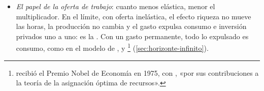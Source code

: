 \documentclass[11pt]{article}
\begin{document}
\begin{itemize}
\begin{itemize}
  \item a largo plazo, un gasto \emph{permanente} eleva el capital en la misma proporción que el empleo, y el multiplicador llega a 0,75~con esta calibración;\footnote{Con un gasto permanente, el tipo de interés y la ratio capital-trabajo vuelven a su nivel, así que el salario no cambia; de la condición del trabajo, $\varphi\,\hat L=-\theta\,\hat C$, y de la restricción de recursos sale $\Delta Y/\Delta G=1/[s_C(\theta+\varphi)/\theta+s_G]$, con $s_C$ y $s_G$ los pesos del consumo y del gasto en el PIB (locales). Con $\theta=\varphi=1$, $s_C\approx0{,}563$ y $s_G=0{,}2$, 0,75.} con una oferta de trabajo más elástica puede superar la unidad\nocite{BaxterKing1993Fiscal}.
  \end{itemize}
\item \emph{El papel de la oferta de trabajo}: cuanto menos elástica, menor el multiplicador. En el límite, con oferta inelástica, el efecto riqueza no mueve las horas, la producción no cambia y el gasto expulsa consumo e inversión privados uno a uno: es la . Con un gasto permanente, todo lo expulsado es consumo, como en el modelo de ,  y \footnote{ recibió el Premio Nobel de Economía en 1975, con , «por sus contribuciones a la teoría de la asignación óptima de recursos»\nocite{NobelPrize1975Koopmans}.} (\ref{sec:horizonte-infinito}).
\end{itemize}
\end{document}

